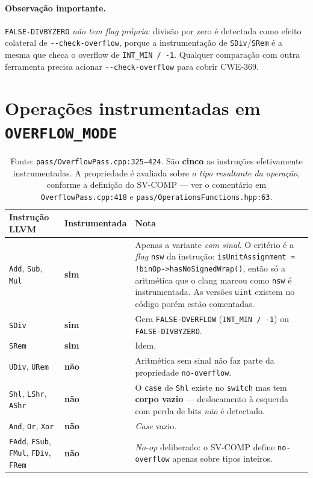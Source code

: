 \documentclass[11pt,a4paper]{article}
\newcommand{\code}[1]{\texttt{#1}}
\newcommand{\flag}[1]{\texttt{-\/-#1}}
\newcommand{\src}[1]{{\small\texttt{#1}}}
\newcommand{\yes}{\textcolor{green!45!black}{\textbf{sim}}}
\newcommand{\no}{\textcolor{red!65!black}{\textbf{não}}}
\begin{document}
\paragraph{Observação importante.} \code{FALSE-DIVBYZERO} \emph{não tem flag
própria}: divisão por zero é detectada como efeito colateral de
\flag{check-overflow}, porque a instrumentação de \code{SDiv}/\code{SRem} é a
mesma que checa o overflow de \code{INT\_MIN / -1}. Qualquer comparação com
outra ferramenta precisa acionar \flag{check-overflow} para cobrir CWE-369.

\section{Operações instrumentadas em \texttt{OVERFLOW\_MODE}}

\begin{table}[H]
\centering
\small
\begin{tabularx}{\textwidth}{@{}L{3.3cm} C{2.9cm} Y@{}}
\toprule
\textbf{Instrução LLVM} & \textbf{Instrumentada} & \textbf{Nota} \\
\midrule
\code{Add}, \code{Sub}, \code{Mul} & \yes &
Apenas a variante \emph{com sinal}. O critério é a \emph{flag} \code{nsw} da
instrução: \src{isUnitAssignment = !binOp->hasNoSignedWrap()}, então só a
aritmética que o clang marcou como \code{nsw} é instrumentada. As versões
\code{uint} existem no código porém estão comentadas. \\
\code{SDiv} & \yes & Gera \code{FALSE-OVERFLOW} (\code{INT\_MIN / -1}) ou \code{FALSE-DIVBYZERO}. \\
\code{SRem} & \yes & Idem. \\
\addlinespace
\code{UDiv}, \code{URem} & \no & Aritmética sem sinal não faz parte da propriedade \code{no-overflow}. \\
\code{Shl}, \code{LShr}, \code{AShr} & \no &
O \code{case} de \code{Shl} existe no \code{switch} mas tem \textbf{corpo
vazio} --- deslocamento à esquerda com perda de bits \emph{não} é detectado. \\
\code{And}, \code{Or}, \code{Xor} & \no & \emph{Case} vazio. \\
\code{FAdd}, \code{FSub}, \code{FMul}, \code{FDiv}, \code{FRem} & \no &
\emph{No-op} deliberado: o SV-COMP define \code{no-overflow} apenas sobre tipos
inteiros. \\
\bottomrule
\end{tabularx}
\caption{Fonte: \src{pass/OverflowPass.cpp:325--424}. São \textbf{cinco} as
instruções efetivamente instrumentadas. A propriedade é avaliada
sobre \emph{o tipo resultante da operação}, conforme a definição do SV-COMP ---
ver o comentário em \src{OverflowPass.cpp:418} e
\src{pass/OperationsFunctions.hpp:63}.}
\end{table}
\end{document}
